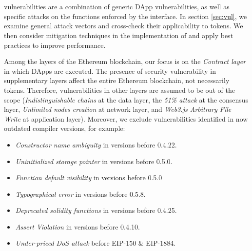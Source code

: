 
\section{\sys}\label{sec:proposal}
\erc vulnerabilities are a combination of generic DApp vulnerabilities, as well as specific attacks on the functions enforced by the \erc interface. In section \ref{sec:vul}, we examine general attack vectors\cite{SolidtySecBlog,EthSecServ,SoliditySecCon,ConsensysSecCon,LandoKL} and cross-check their applicability to \erc tokens. { \blue We then consider mitigation techniques in the implementation of \sys and apply best practices to improve performance.}

Among the layers of the Ethereum blockchain, our focus is on the \textit{Contract layer} in which DApps are executed. The presence of security vulnerability in supplementary layers affect the entire Ethereum blockchain, not necessarily \erc tokens. Therefore, vulnerabilities in other layers are assumed to be out of the scope (\eg \textit{Indistinguishable chains} at the data layer, the \textit{51\% attack} at the consensus layer, \textit{Unlimited nodes creation} at network layer, and \textit{Web3.js Arbitrary File Write} at application layer). Moreover, we exclude vulnerabilities identified in now outdated compiler versions, for example:
\begin{itemize}[noitemsep,topsep=0pt]
	\item \textit{Constructor name ambiguity} in versions before 0.4.22.
	\item \textit{Uninitialized storage pointer} in versions before 0.5.0.
	\item \textit{Function default visibility} in versions before 0.5.0
	\item \textit{Typographical error} in versions before 0.5.8.
	\item \textit{Deprecated solidity functions} in versions before 0.4.25.
	\item \textit{Assert Violation} in versions before 0.4.10.
	\item \textit{Under-priced DoS attack} before EIP-150 \& EIP-1884.
\end{itemize}

